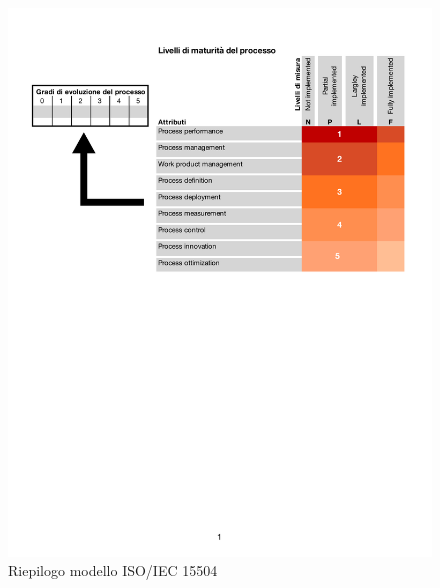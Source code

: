 \documentclass[11pt,a4paper]{article}
\begin{document}
{\begin{itemize}
	\end{itemize}
	\begin{figure}[htbp]
	\centering
	\includegraphics[scale=0.7]{images/ISOIEC15504.pdf}
	\caption{Riepilogo modello ISO/IEC 15504}
	\end{figure}
	
}
\end{document}
